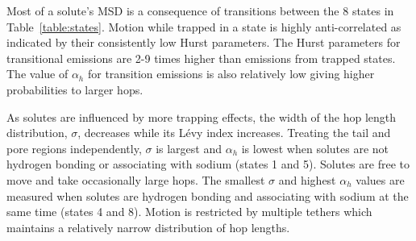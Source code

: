 \documentclass{article}
\begin{document}

  Most of a solute's MSD is a consequence of transitions between the 8 states
  in Table~\ref{table:states}. Motion while trapped in a state is highly 
  anti-correlated as indicated by their consistently low Hurst parameters.
  The Hurst parameters for transitional emissions are 2-9 times higher than
  emissions from trapped states. The value of $\alpha_h$ for transition 
  emissions is also relatively low giving higher probabilities to larger hops.
  
  As solutes are influenced by more trapping effects, the width of the hop length
  distribution, $\sigma$, decreases while its L\'evy index increases. Treating the
  tail and pore regions independently, $\sigma$ is largest and $\alpha_h$ is lowest
  when solutes are not hydrogen bonding or associating with sodium (states 1 and 5).
  Solutes are free to move and take occasionally large hops. The smallest $\sigma$
  and highest $\alpha_h$ values are measured when solutes are hydrogen bonding and 
  associating with sodium at the same time (states 4 and 8). Motion is restricted 
  by multiple tethers which maintains a relatively narrow distribution of hop lengths.
  
\end{document}
